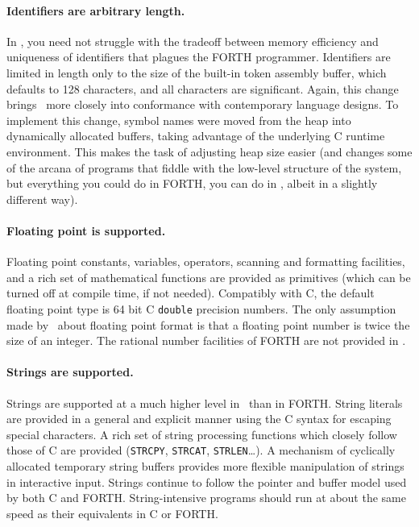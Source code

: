 \documentclass[twocolumn]{article}
\begin{document}
\paragraph{Identifiers are arbitrary length.}  In \atlast , you need
not struggle with the tradeoff between memory efficiency and
uniqueness of identifiers that plagues the FORTH programmer.
Identifiers are limited in length only to the size of the built-in
token assembly buffer, which defaults to 128 characters, and
all characters are significant.  Again, this change brings \atlast\ more
closely into conformance with contemporary language designs.
To implement this change, symbol names were moved from the heap into
dynamically allocated buffers, taking advantage of the underlying C
runtime environment.  This makes the task of adjusting heap size
easier (and changes some of the arcana of programs that fiddle with
the low-level structure of the system, but everything you could do in
FORTH, you can do in \atlast, albeit in a slightly different way).

\paragraph{Floating point is supported.}  Floating point constants,
variables, operators, scanning and formatting facilities, and a rich
set of mathematical functions are provided as
primitives (which can be turned off at compile time, if not needed).
Compatibly with C, the default floating point type is 64 bit
C {\tt double} precision numbers.  The only assumption made by \atlast\
about floating point format is that a floating point number is twice
the size of an integer.  The rational number facilities of FORTH are
not provided in \atlast .

\paragraph{Strings are supported.}  Strings are supported at a much
higher level in \atlast\ than in FORTH\@.  String literals are provided
in a general and explicit manner using the C syntax for escaping
special characters.  A rich set of string processing functions which
closely follow those of C are provided ({\tt STRCPY}, {\tt STRCAT},
{\tt STRLEN}\ldots ).  A mechanism of cyclically allocated temporary
string buffers provides more flexible manipulation of strings in
interactive input.  Strings continue to follow the pointer and buffer
model used by both C and FORTH\@.  String-intensive programs should
run at about the same speed as their equivalents in C or FORTH\@.
\end{document}
